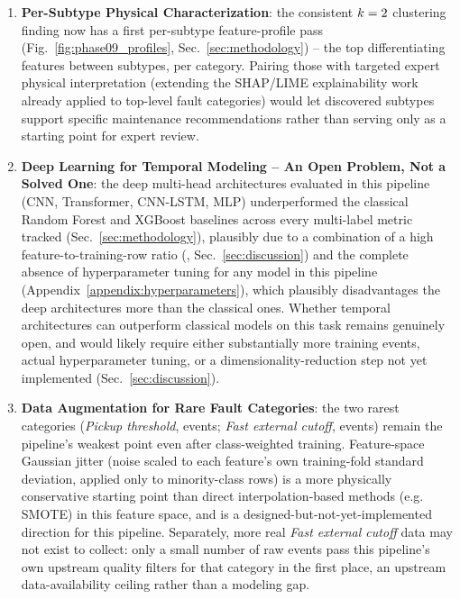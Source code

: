 \begin{enumerate}
    \item \textbf{Per-Subtype Physical Characterization}: the consistent $k=2$ clustering finding now has a first per-subtype feature-profile pass (Fig.~\ref{fig:phase09_profiles}, Sec.~\ref{sec:methodology}) -- the top differentiating features between subtypes, per category. Pairing those with targeted expert physical interpretation (extending the SHAP/LIME explainability work already applied to top-level fault categories) would let discovered subtypes support specific maintenance recommendations rather than serving only as a starting point for expert review.

    \item \textbf{Deep Learning for Temporal Modeling -- An Open Problem, Not a Solved One}: the deep multi-head architectures evaluated in this pipeline (CNN, Transformer, CNN-LSTM, MLP) underperformed the classical Random Forest and XGBoost baselines across every multi-label metric tracked (Sec.~\ref{sec:methodology}), plausibly due to a combination of a high feature-to-training-row ratio (\MetricOneZeroPhaseThreeWeaknessDiagnosisFeatureToTrainRowRatio, Sec.~\ref{sec:discussion}) and the complete absence of hyperparameter tuning for any model in this pipeline (Appendix~\ref{appendix:hyperparameters}), which plausibly disadvantages the deep architectures more than the classical ones. Whether temporal architectures can outperform classical models on this task remains genuinely open, and would likely require either substantially more training events, actual hyperparameter tuning, or a dimensionality-reduction step not yet implemented (Sec.~\ref{sec:discussion}).

    \item \textbf{Data Augmentation for Rare Fault Categories}: the two rarest categories (\textit{Pickup threshold}, \MetricZeroZeroDataAttritionChainGtPassingSeuilPickUp{} events; \textit{Fast external cutoff}, \MetricZeroZeroDataAttritionChainGtPassingCoupureExterneRapide{} events) remain the pipeline's weakest point even after class-weighted training. Feature-space Gaussian jitter (noise scaled to each feature's own training-fold standard deviation, applied only to minority-class rows) is a more physically conservative starting point than direct interpolation-based methods (e.g. SMOTE) in this feature space, and is a designed-but-not-yet-implemented direction for this pipeline. Separately, more real \textit{Fast external cutoff} data may not exist to collect: only a small number of raw events pass this pipeline's own upstream quality filters for that category in the first place, an upstream data-availability ceiling rather than a modeling gap.


\end{enumerate}
